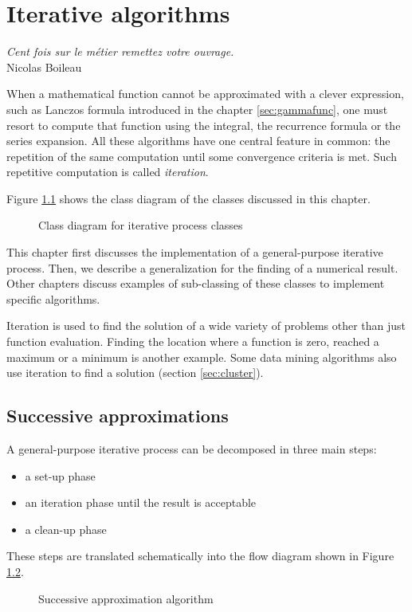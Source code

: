\documentclass[twoside]{book}
\begin{document}
\fi

\chapter{Iterative algorithms}
\label{ch:iteration} \vspace{1 ex}
\begin{flushright}
{\sl Cent fois sur le m\'etier remettez votre ouvrage.}\\ Nicolas
Boileau
\end{flushright}
\vspace{1 ex} When a mathematical function cannot be approximated
with a clever expression, such as Lanczos formula introduced in
the chapter \ref{sec:gammafunc}, one must resort to compute that
function using the integral, the recurrence formula or the series
expansion. All these algorithms have one central feature in
common: the repetition of the same computation until some
convergence criteria is met. Such repetitive computation is called
{\it iteration}.

Figure \ref{cl:iteration} shows the class diagram of the classes
discussed in this chapter.
\begin{figure}
\center{}
\caption{Class diagram for iterative process
classes}\label{cl:iteration}
\end{figure}
This chapter first discusses the implementation of a
general-purpose iterative process. Then, we describe a
generalization for the finding of a numerical result. Other
chapters discuss examples of sub-classing of these classes to
implement specific algorithms.

Iteration is used to find the solution of a wide variety of
problems other than just function evaluation. Finding the location
where a function is zero, reached a maximum or a minimum is
another example. Some data mining algorithms also use iteration to
find a solution (\cf section \ref{sec:cluster}).

\section{Successive approximations}
\label{sec:iteration} A general-purpose iterative process can be
decomposed in three main steps:
\begin{itemize}
  \item a set-up phase
  \item an iteration phase until the result is acceptable
  \item a clean-up phase
\end{itemize}
\noindent These steps are translated schematically into the flow
diagram shown in Figure \ref{fig:itercoarse}.
\begin{figure}
\center{}
\caption{Successive approximation algorithm}\label{fig:itercoarse}
\end{figure}
\end{document}

